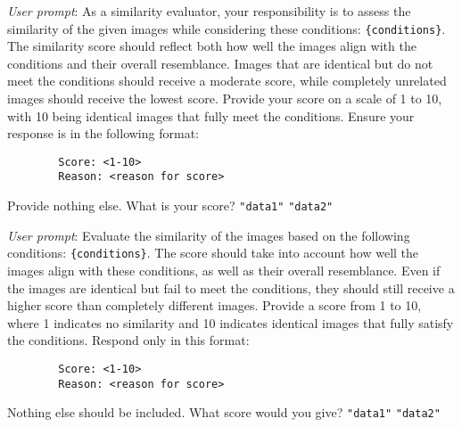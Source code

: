 \begin{tcolorbox}[enhanced,attach boxed title to top center={yshift=-3mm,yshifttext=-1mm},
  colback=blue!5!white,colframe=blue!20!gray,colbacktitle=blue!20!gray,
  title=Image-Image Prompt Template V2,fonttitle=\bfseries,
  boxed title style={size=small,colframe=blue!20!gray} ]

        \emph{User prompt}: As a similarity evaluator, your responsibility is to assess the similarity of the given images while considering these conditions: \texttt{\{conditions\}}. The similarity score should reflect both how well the images align with the conditions and their overall resemblance. Images that are identical but do not meet the conditions should receive a moderate score, while completely unrelated images should receive the lowest score. Provide your score on a scale of 1 to 10, with 10 being identical images that fully meet the conditions. Ensure your response is in the following format:
        
        \begin{verbatim}
        Score: <1-10>
        Reason: <reason for score>
        \end{verbatim}
                
        Provide nothing else. What is your score? \texttt{"data1"} \texttt{"data2"}

\end{tcolorbox}

\begin{tcolorbox}[enhanced,attach boxed title to top center={yshift=-3mm,yshifttext=-1mm},
  colback=blue!5!white,colframe=blue!20!gray,colbacktitle=blue!20!gray,
  title=Image-Image Prompt Template V3,fonttitle=\bfseries,
  boxed title style={size=small,colframe=blue!20!gray} ]

        \emph{User prompt}: Evaluate the similarity of the images based on the following conditions: \texttt{\{conditions\}}. The score should take into account how well the images align with these conditions, as well as their overall resemblance. Even if the images are identical but fail to meet the conditions, they should still receive a higher score than completely different images. Provide a score from 1 to 10, where 1 indicates no similarity and 10 indicates identical images that fully satisfy the conditions. Respond only in this format:
        
        \begin{verbatim}
        Score: <1-10>
        Reason: <reason for score>
        \end{verbatim}
                
        Nothing else should be included. What score would you give? \texttt{"data1"} \texttt{"data2"}

\end{tcolorbox}

